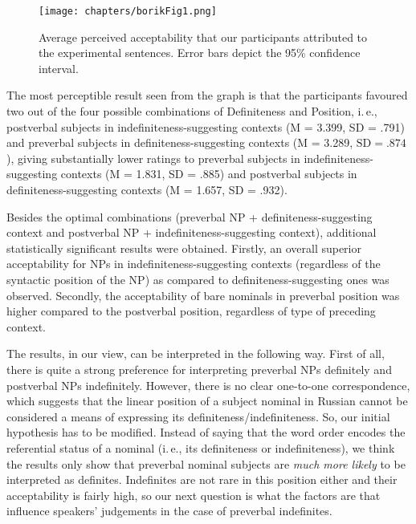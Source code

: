 \documentclass[output=paper]{langsci/langscibook}
\begin{document}
\begin{figure}
\centering
\texttt{[image: chapters/borikFig1.png]}
\caption{Average perceived acceptability that our participants attributed to the experimental sentences. Error bars depict the 95\% confidence interval.}\label{2fig:1}
\end{figure}

{
\hspace*{-1.7mm}The most perceptible result seen from the graph is that the participants favoured two out of the four possible combinations of Definiteness and Position, i.\,e., postverbal subjects in indefiniteness-suggesting contexts (M = 3.399, SD = .791) and preverbal subjects in definiteness-suggesting contexts (M = 3.289, $\text{SD} = .874$), giving substantially lower ratings to preverbal subjects in indefiniteness-suggesting contexts (M = 1.831, SD = .885) and postverbal subjects in definiteness-suggesting contexts (M = 1.657, SD = .932).
}

Besides the optimal combinations (preverbal NP + definiteness-suggesting context and postverbal NP + indefiniteness-suggesting context), additional statistically significant results were obtained. Firstly, an overall superior acceptability for NPs in indefiniteness-suggesting contexts (regardless of the syntactic position of the NP) as compared to definiteness-suggesting ones was observed. Secondly, the acceptability of bare nominals in preverbal position was higher compared to the postverbal position, regardless of type of preceding context.

The results, in our view, can be interpreted in the following way. First of all, there is quite a strong preference for interpreting preverbal NPs definitely and postverbal NPs indefinitely. However, there is no clear one-to-one correspondence, which suggests that the linear position of a subject nominal in Russian cannot be considered a means of expressing its definiteness/indefiniteness. So, our initial hypothesis has to be modified. Instead of saying that the word order encodes the referential status of a nominal (i.\,e., its definiteness or indefiniteness), we think the results only show that preverbal nominal subjects are {\emph{much more likely}} to be interpreted as definites. Indefinites are not rare in this position either and their acceptability is fairly high, so our next question is what the factors are that influence speakers' judgements in the case of preverbal indefinites. 
\end{document}
